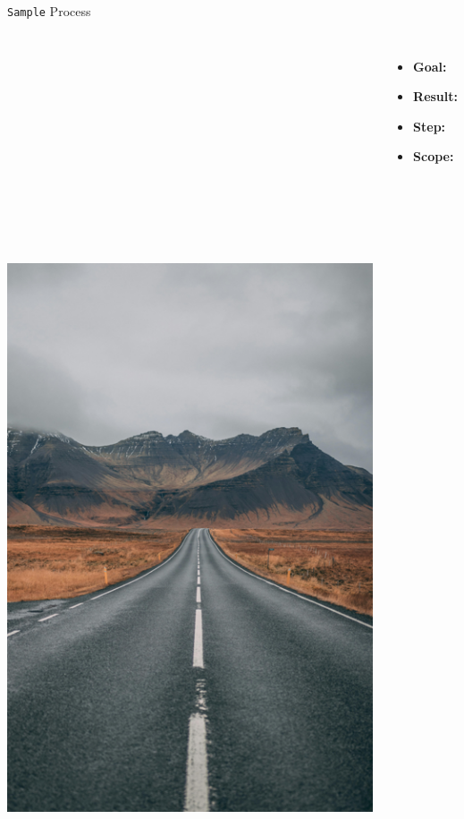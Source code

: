 \documentclass{beamer}
\begin{document}

\begin{frame}[label=process1]{\texttt{Sample} Process 
  \hyperlink{algo1}{} 
  \hyperlink{pseudocode1}{}
}
	\begin{columns}
		\centering
		\includegraphics[height=1.8\textwidth]{samplev.png}
		\begin{itemize}
			\item \textbf{Goal:}
			\item \textbf{Result:}
			\item \textbf{Step:} 
			\item \textbf{Scope:}
		\end{itemize}
	\end{columns}
	\note{}
\end{frame}
								
\end{document}

